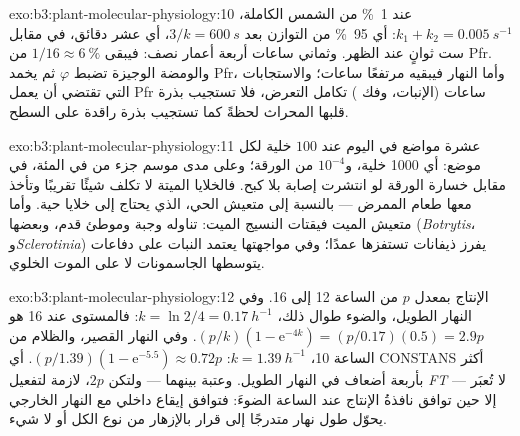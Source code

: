 \begin{solution}{exo:b3:plant-molecular-physiology:10}
عند \qty{1}{\%} من الشمس الكاملة، $k_{1} + k_{2} = \qty{0.005}{s^{-1}}$: أي
95~\% من التوازن بعد $3/k = \qty{600}{s}$، أي عشر دقائق، في
مقابل ست ثوانٍ عند الظهر. وثماني ساعات أربعة أعمار نصف:
فيبقى $1/16 \approx
\qty{6}{\%}$ من Pfr. والومضة الوجيزة تضبط
$\varphi$ ثم يخمد Pfr، وأما النهار فيبقيه مرتفعًا ساعات؛
والاستجابات التي تقتضي أن يعمل Pfr ساعات (الإنبات، وفك
) تكامل التعرض، فلا تستجيب بذرة قلبها المحراث لحظةً
كما تستجيب بذرة راقدة على السطح.
\end{solution}

\begin{solution}{exo:b3:plant-molecular-physiology:11}
عشرة مواضع في اليوم عند $100$ خلية لكل موضع: أي \num{1000}
خلية، و$10^{-4}$ من الورقة؛ وعلى مدى موسم جزء من في المئة، في
مقابل خسارة الورقة لو انتشرت إصابة بلا كبح. فالخلايا الميتة
لا تكلف شيئًا تقريبًا وتأخذ معها طعام الممرض --- بالنسبة إلى
متعيش الحي، الذي يحتاج إلى خلايا حية. وأما متعيش الميت
فيقتات النسيج الميت:  تناوله وجبة
وموطئ قدم، وبعضها (\emph{Botrytis}، و\emph{Sclerotinia}) يفرز
ذيفانات تستفزها عمدًا؛ وفي مواجهتها يعتمد النبات على دفاعات
يتوسطها الجاسمونات لا على الموت الخلوي.
\end{solution}

\begin{solution}{exo:b3:plant-molecular-physiology:12}
الإنتاج بمعدل $p$ من الساعة 12 إلى 16. وفي النهار الطويل،
والضوء طوال ذلك، $k = \ln 2/4 = \qty{0.17}{h^{-1}}$: فالمستوى عند
16 هو $(p/k)(1 -
\mathrm{e}^{-4k}) = (p/0.17)(0.5) = 2.9p$. وفي النهار القصير، والظلام
من الساعة 10، $k = \qty{1.39}{h^{-1}}$: $(p/1.39)(1 - \mathrm{e}^{-5.5})
\approx 0.72p$. أي CONSTANS أكثر بأربعة أضعاف في النهار الطويل.
وعتبة بينهما --- ولتكن $2p$، لازمة لتفعيل \emph{FT} --- لا
تُعبَر إلا حين توافق نافذةُ الإنتاج عند الساعة الضوءَ:
فتوافق إيقاع داخلي مع النهار الخارجي يحوّل طول نهار متدرجًا
إلى قرار بالإزهار من نوع الكل أو لا شيء.
\end{solution}

